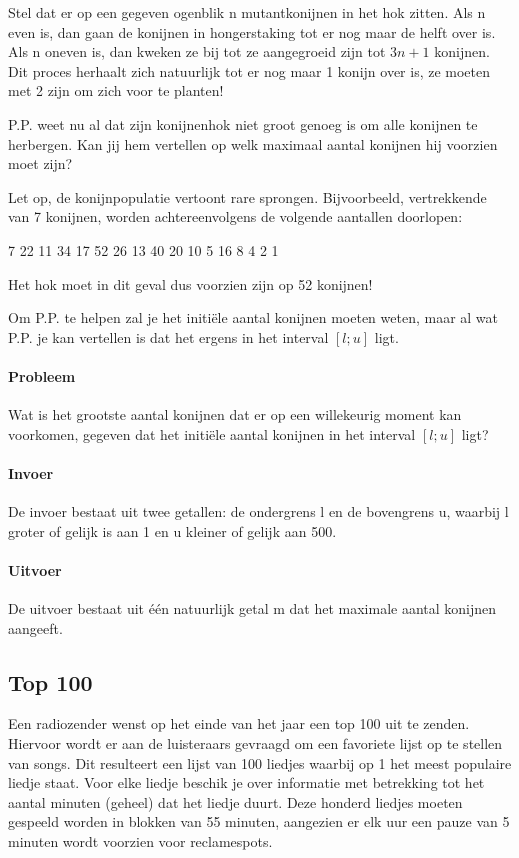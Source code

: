 Stel dat er op een gegeven ogenblik n mutantkonijnen in het hok zitten. Als n even is, dan gaan de konijnen in hongerstaking tot er nog maar de helft over is. Als n oneven is, dan kweken ze bij tot ze aangegroeid zijn tot $3n + 1$ konijnen. Dit proces herhaalt zich natuurlijk tot er nog maar 1 konijn over is, ze moeten met 2 zijn om zich voor te planten!

P.P. weet nu al dat zijn konijnenhok niet groot genoeg is om alle konijnen te herbergen. Kan jij hem vertellen op welk maximaal aantal konijnen hij voorzien moet zijn?

Let op, de konijnpopulatie vertoont rare sprongen. Bijvoorbeeld, vertrekkende van 7 konijnen, worden achtereenvolgens de volgende aantallen doorlopen:

7 22 11 34 17 52 26 13 40 20 10 5 16 8 4 2 1

Het hok moet in dit geval dus voorzien zijn op 52 konijnen!

Om P.P. te helpen zal je het initi\"ele aantal konijnen moeten weten, maar al wat P.P. je kan vertellen is dat het ergens in het interval $[l; u]$ ligt.

\paragraph{Probleem} Wat is het grootste aantal konijnen dat er op een willekeurig moment kan voorkomen, gegeven dat het initi\"ele aantal konijnen in het interval $[l; u]$ ligt?

\paragraph{Invoer} De invoer bestaat uit twee getallen: de ondergrens l en de bovengrens u, waarbij l groter of gelijk is aan 1 en u kleiner of gelijk aan 500.

\paragraph{Uitvoer} De uitvoer bestaat uit \'e\'en natuurlijk getal m dat het maximale aantal konijnen aangeeft.

\subsection{Top 100}

Een radiozender wenst op het einde van het jaar een top 100 uit te zenden. Hiervoor wordt er aan de luisteraars gevraagd om een favoriete lijst op te stellen van songs. Dit resulteert een lijst van 100 liedjes waarbij op 1 het meest populaire liedje staat. Voor elke liedje beschik je over informatie met betrekking tot het aantal minuten (geheel) dat het liedje duurt. Deze honderd liedjes moeten gespeeld worden in blokken van 55 minuten, aangezien er elk uur een pauze van 5 minuten wordt voorzien voor reclamespots.

